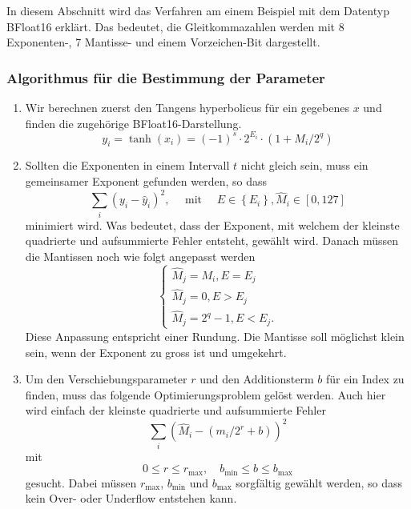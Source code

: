 In diesem Abschnitt wird das Verfahren am einem Beispiel mit dem Datentyp BFloat16 erklärt.
Das bedeutet, die Gleitkommazahlen werden mit 8 Exponenten-, 7 Mantisse- und einem Vorzeichen-Bit dargestellt.

\subsubsection{Algorithmus für die Bestimmung der Parameter
	\label{transfer:subsection:Ktanh-Algorithmus:Algo}}

\begin{enumerate}
    \item Wir berechnen zuerst den Tangens hyperbolicus für ein gegebenes $x$ und finden die zugehörige BFloat16-Darstellung.
    \[
    y_{i}=\operatorname{tanh}\left(x_{i}\right)=(-1)^{s} \cdot 2^{E_{i}} \cdot\left(1+M_{i} / 2^{q}\right)
    \]
     
    \item Sollten die Exponenten in einem Intervall $t$ nicht gleich sein, muss ein gemeinsamer Exponent gefunden werden, so dass 
\begin{equation} \label{minforexp}
	\sum_{i}\left(y_{i}-\hat{y}_{i}\right)^{2}, \quad \text { mit } \quad E \in\left\{E_{i}\right\}, \hat{M}_{i} \in[0,127]
\end{equation}
minimiert wird. Was bedeutet, dass der Exponent, mit welchem der
kleinste quadrierte und aufsummierte Fehler entsteht, gewählt wird.
Danach müssen die Mantissen noch wie folgt angepasst werden
    \[
    \left\{\begin{array}{l}
    	\hat{M}_{j}=M_{i}, E=E_{j} \\
    	\hat{M}_{j}=0, E>E_{j} \\
    	\hat{M}_{j}=2^{q}-1, E<E_{j}.
    \end{array}\right.
    \]
	Diese Anpassung entspricht einer Rundung. Die Mantisse soll möglichst klein sein, wenn der Exponent zu gross ist und umgekehrt.
    \item Um den Verschiebungsparameter $r$ und den Additionsterm $b$ für ein Index zu finden, muss das folgende Optimierungsproblem gelöst werden.
Auch hier wird einfach der kleinste quadrierte und aufsummierte Fehler
\[
\sum_{i}\left(\hat{M}_{i}-\left(m_{i} / 2^{r}+b\right)\right)^{2}
\]
mit
\[
0 \leq r \leq r_{\max }, \quad b_{\min } \leq b \leq b_{\max }
\]
gesucht.
Dabei müssen $r_{\max}$, $b_{\min}$ und $b_{\max}$
sorgfältig gewählt werden, so dass kein Over- oder Underflow entstehen kann.
\end{enumerate}

